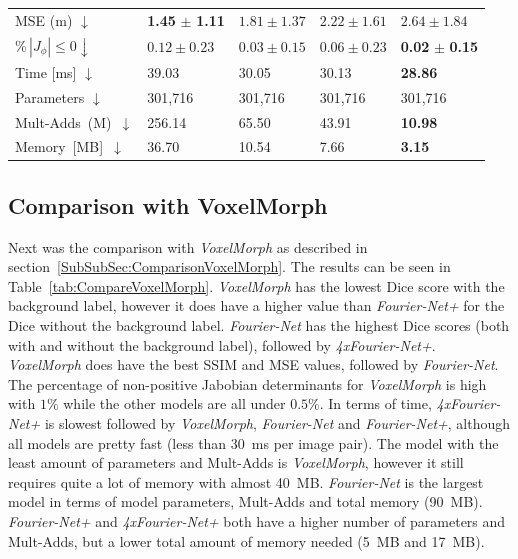 \begin{table}[h]
\begin{tabularx}{\textwidth}{Y Y Y Y Y}
		MSE (m) $\downarrow$ & \textbf{1.45} $\pm$ \textbf{1.11} & $1.81 \pm 1.37$ & $2.22 \pm 1.61$ & $2.64 \pm 1.84$ \\
		$\% \, |J_{\phi}|\leq0 \downarrow$ & $0.12 \pm 0.23$ & $0.03 \pm 0.15$ & $0.06 \pm 0.23$ & \textbf{0.02} $\pm$ \textbf{0.15} \\	
		Time [ms] $\downarrow$ 	 & 39.03  & 30.05  & 30.13  & \textbf{28.86} \\
		Parameters  $\downarrow$	 & 301,716 & 301,716 & 301,716 & 301,716 \\
		\mbox{Mult-Adds (M) $\downarrow$} & 256.14  & 65.50   & 43.91   & \textbf{10.98} \\
		\mbox{Memory [MB]  $\downarrow$} 	 & 36.70   & 10.54   & 7.66    & \textbf{3.15} \\
		\bottomrule
	\end{tabularx}
\end{table}

\subsection{Comparison with VoxelMorph} \label{SubSec:ResultsComparisonVoxelMorph}
Next was the comparison with \emph{VoxelMorph} as described in section~\ref{SubSubSec:ComparisonVoxelMorph}. The results can be seen in Table~\ref{tab:CompareVoxelMorph}. \emph{VoxelMorph} has the lowest Dice score with the background label, however it does have a higher value than \emph{Fourier-Net+} for the Dice without the background label. \emph{Fourier-Net} has the highest Dice scores (both with and without the background label), followed by \emph{4xFourier-Net+}. \emph{VoxelMorph} does have the best SSIM and MSE values, followed by \emph{Fourier-Net}. The percentage of non-positive Jabobian determinants for \emph{VoxelMorph} is high with $1\%$ while the other models are all under $0.5\%$. In terms of time, \emph{4xFourier-Net+} is slowest followed by \emph{VoxelMorph}, \emph{Fourier-Net} and \emph{Fourier-Net+}, although all models are pretty fast (less than 30~ms per image pair). The model with the least amount of parameters and Mult-Adds is \emph{VoxelMorph}, however it still requires quite a lot of memory with almost 40~MB. \emph{Fourier-Net} is the largest model in terms of model parameters, Mult-Adds and total memory (90~MB). \emph{Fourier-Net+} and \emph{4xFourier-Net+} both have a higher number of parameters and Mult-Adds, but a lower total amount of memory needed (5~MB and 17~MB). 

